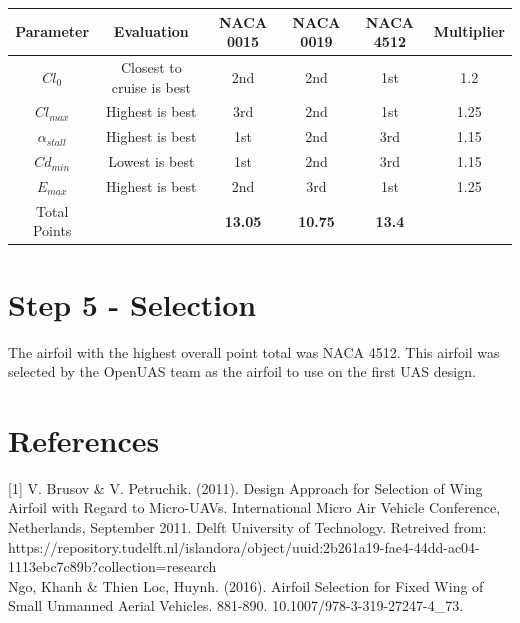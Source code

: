 \documentclass{article}
\begin{document}
\begin{tabular}[pos]{| c | c | c | c | c | c |}


\hline
Parameter & Evaluation & NACA 0015 & NACA 0019 & NACA 4512 & Multiplier \\ \hline
$Cl_{0}$ & Closest to cruise is best & 2nd & 2nd & 1st & 1.2  \\ \hline
$Cl_{max}$ & Highest is best & 3rd & 2nd & 1st & 1.25 \\ \hline
$\alpha_{stall}$ & Highest is best & 1st & 2nd & 3rd & 1.15 \\ \hline
$Cd_{min}$ & Lowest is best & 1st & 2nd & 3rd & 1.15 \\ \hline
$E_{max}$ & Highest is best & 2nd & 3rd & 1st & 1.25  \\ \hline
Total Points & & \textbf{13.05} & \textbf{10.75} & \textbf{13.4} & \\ \hline


\end{tabular}


\section*{Step 5 - Selection}

The airfoil with the highest overall point total was NACA 4512. This airfoil was selected by the OpenUAS team as the airfoil to use on the first UAS design.


\section*{References}

[1] V. Brusov \& V. Petruchik. (2011). Design Approach for Selection of Wing Airfoil with Regard to Micro-UAVs. International Micro Air Vehicle Conference, Netherlands, September 2011. Delft University of Technology. Retreived from: https://repository.tudelft.nl/islandora/object/uuid:2b261a19-fae4-44dd-ac04-1113ebc7c89b?collection=research \\

\noindent [2] Ngo, Khanh \& Thien Loc, Huynh. (2016). Airfoil Selection for Fixed Wing of Small Unmanned Aerial Vehicles. 881-890. 10.1007/978-3-319-27247-4\_73.
\end{document}
